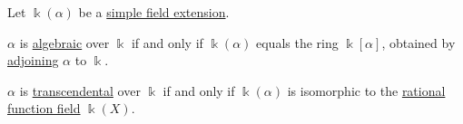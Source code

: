 \begin{proposition}\label{thm:simple_field_extension_characterization}
  Let \( \Bbbk(\alpha) \) be a \hyperref[def:simple_field_extension]{simple field extension}.
  \begin{thmenum}
     \( \alpha \) is \hyperref[def:algebraic_element]{algebraic} over \( \Bbbk \) if and only if \( \Bbbk(\alpha) \) equals the ring \( \Bbbk[\alpha] \), obtained by \hyperref[def:semiring_adjunction]{adjoining} \( \alpha \) to \( \Bbbk \).

     \( \alpha \) is \hyperref[def:transcendental_element]{transcendental} over \( \Bbbk \) if and only if \( \Bbbk(\alpha) \) is isomorphic to the \hyperref[def:rational_function_field]{rational function field} \( \Bbbk(X) \).
  \end{thmenum}
\end{proposition}
